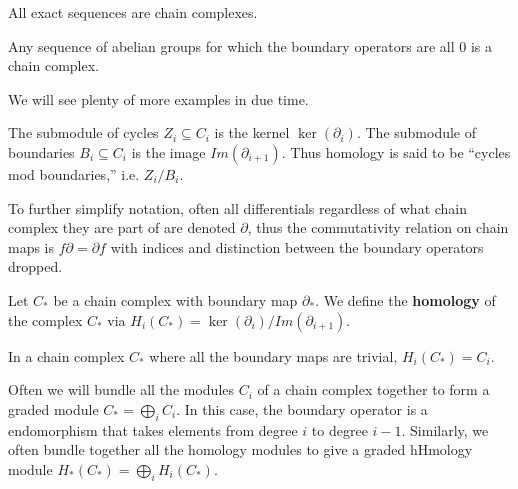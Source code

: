 \begin{example} All exact sequences are chain complexes.
\end{example}

\begin{example} Any sequence of abelian groups for which the
boundary operators
are all $0$ is a chain complex. \end{example}

We will see plenty of more examples in due time.

\begin{definition} The submodule of cycles $Z_i\subseteq C_i$ is
the kernel $\ker(\partial_i)$. The submodule of boundaries
$B_i\subseteq C_i$ is the image $Im(\partial_{i+1})$. Thus
homology is said to be ``cycles mod boundaries,'' i.e.
$Z_i/B_i$.
\end{definition}

To further simplify notation, often all differentials regardless
of what chain complex they are part of are denoted $\partial$,
thus the commutativity relation on chain maps is
$f\partial=\partial f$ with indices and distinction between the
boundary operators dropped.


\begin{definition} Let $C_*$ be a chain complex with boundary
map $\partial_*$.
We define the \textbf{homology} of the complex $C_*$ via
$H_i(C_*)=\ker(\partial_i)/Im(\partial_{i+1})$.
\end{definition}

\begin{example} In a chain complex $C_*$ where all the boundary
maps are
trivial, $H_i(C_*)=C_i$. 
\end{example}

Often we will bundle all the modules $C_i$ of a chain complex
together to form a graded module $C_*=\bigoplus_i C_i$. In this
case, the boundary operator is a
endomorphism that takes elements from degree $i$ to degree
$i-1$. Similarly, we
often bundle together all the homology modules to give a graded
hHmology module
$H_*(C_*)=\bigoplus_i H_i(C_*)$.

